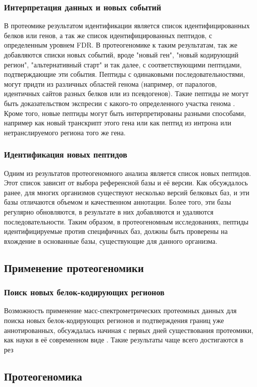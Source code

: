 \subsubsection{Интерпретация данных и новых событий}
В протеомике результатом идентификации является список идентифицированных белков или генов, а так же список идентифицированных пептидов, с определенным уровнем FDR. В протеогеномике к таким результатам, так же добавляются списки новых событий, вроде "новый ген", "новый кодирующий регион", "альтернативный старт" и так далее, с соответствующими пептидами, подтверждающие эти события. Пептиды с одинаковыми последовательностями, могут придти из различных областей генома (например, от паралогов, идентичных сайтов разных белков или из псевдогенов). Такие пептиды не могут быть доказательством экспресии с какого-то определенного участка генома \cite{nesvizhskii2005interpretation}. Кроме того, новые пептиды могут быть интерпретированы разными способами, например как новый транскрипт этого гена или как пептид из интрона или нетранслируемого региона того же гена. 

\subsubsection{Идентификация новых пептидов}
Одним из результатов протеогеномного анализа является список новых пептидов. Этот список зависит от выбора референсной базы и её версии. Как обсуждалось ранее, для многих организмов существуют несколько версий белковых баз, и эти базы отличаются объемом и качественном аннотации. Более того, эти базы регулярно обновляются, в результате в них добавляются и удаляются последовательности. Таким образом, в протеогеномным исследованиях, пептиды идентифицируемые против специфичных баз, должны быть проверены на вхождение в основанные базы, существующие для данного организма.

\subsection{Применение протеогеномики}

\subsubsection{Поиск новых белок-кодирующих регионов}
Возможность применение масс-спектрометрических протеомных данных для поиска новых белок-кодирующих регионов и подтверждения границ уже аннотированных, обсуждалась начиная с первых дней существования протеомики, как науки в её современном виде \cite{choudhary2001interrogating, andersen2001mass}. Такие результаты чаще всего достигаются в рез


\subsection{Протеогеномика }






























\newpage
